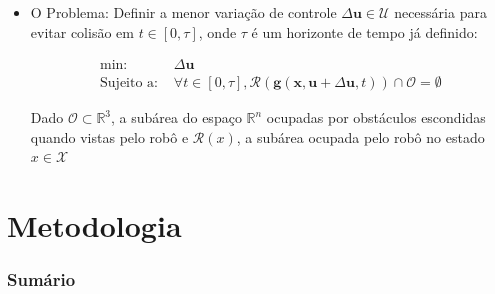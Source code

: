 \documentclass{beamer}
\begin{document}
\begin{frame}[allowframebreaks]
\begin{itemize}
		\item O Problema: Definir a menor variação de controle $\Delta\mathbf{u} \in \mathcal{U}$ necessária para evitar colisão em $t \in [0,\tau]$, onde $\tau$ é um horizonte de tempo já definido:
		
		\begin{equation}
		\begin{aligned}
		\text{min: }& \Delta\mathbf{u} \\
		\text{Sujeito a: }& \forall t \in [0,\tau], \mathcal{R}(\mathbf{g}(\mathbf{x}, \mathbf{u}+\Delta\mathbf{u}, t)) \cap \mathcal{O} = \emptyset
		\end{aligned}
		\label{eq:equacaoProb}
		\end{equation}
		
		Dado $\mathcal{O} \subset \mathbb{R}^3$, a subárea do espaço $\mathbb{R}^n$ ocupadas por obstáculos escondidas quando vistas pelo robô e $\mathcal{R}(x)$, a subárea ocupada pelo robô no estado $x \in \mathcal{X}$
			
		
		
	\end{itemize}	 
\end{frame}


\section{Metodologia}

\begin{frame}
	\frametitle{Sumário}
	\tableofcontents[currentsection]
\end{frame}
\end{document}
